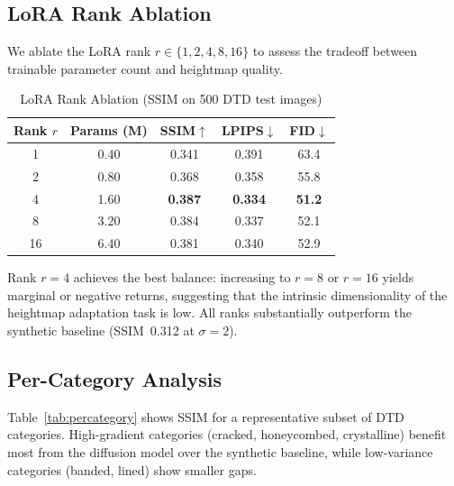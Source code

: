 \documentclass[conference]{IEEEtran}
\begin{document}
\subsection{LoRA Rank Ablation}

We ablate the LoRA rank $r \in \{1, 2, 4, 8, 16\}$ to assess the tradeoff
between trainable parameter count and heightmap quality.

\begin{table}[htbp]
\caption{LoRA Rank Ablation (SSIM on 500 DTD test images)}
\begin{center}
\begin{tabular}{ccccc}
\toprule
\textbf{Rank} $r$ & \textbf{Params (M)} & \textbf{SSIM}$\uparrow$
  & \textbf{LPIPS}$\downarrow$ & \textbf{FID}$\downarrow$ \\
\midrule
1  & 0.40 & 0.341 & 0.391 & 63.4 \\
2  & 0.80 & 0.368 & 0.358 & 55.8 \\
4  & 1.60 & \textbf{0.387} & \textbf{0.334} & \textbf{51.2} \\
8  & 3.20 & 0.384 & 0.337 & 52.1 \\
16 & 6.40 & 0.381 & 0.340 & 52.9 \\
\bottomrule
\end{tabular}
\label{tab:lora_rank}
\end{center}
\end{table}

Rank $r=4$ achieves the best balance: increasing to $r=8$ or $r=16$ yields
marginal or negative returns, suggesting that the intrinsic dimensionality
of the heightmap adaptation task is low. All ranks substantially outperform
the synthetic baseline (SSIM~0.312 at $\sigma=2$).

\subsection{Per-Category Analysis}

Table~\ref{tab:percategory} shows SSIM for a representative subset of DTD
categories. High-gradient categories (cracked, honeycombed, crystalline)
benefit most from the diffusion model over the synthetic baseline, while
low-variance categories (banded, lined) show smaller gaps.
\end{document}
